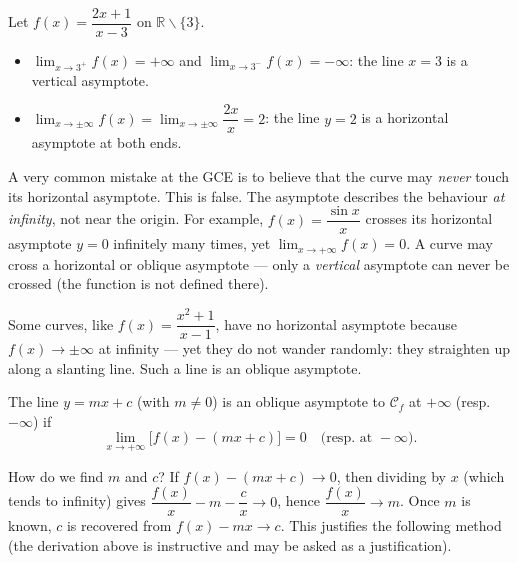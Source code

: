 \documentclass[11pt]{article}
\newcommand{\cle}[1]{{\popxbold\color{popdark}#1}}
\newcounter{popsec}
\newcounter{popsub}
\newcommand{\courssub}[1]{%
  \stepcounter{popsub}%
  \par\vspace{9pt}\noindent{\popxbold\fontsize{11.5}{13}\selectfont\color{popink}{\color{poporange}\thepopsec.\thepopsub}\hspace{6pt}#1}\par\nopagebreak\vspace{4pt}
}
\def\setminus{\mathbin{\backslash}}\let\smallsetminus\setminus
\begin{document}
\begin{exemplebox}
Let $f(x)=\dfrac{2x+1}{x-3}$ on $\mathbb{R}\setminus\{3\}$.
\begin{itemize}
\item $\displaystyle\lim_{x\to 3^{+}}f(x)=+\infty$ and $\displaystyle\lim_{x\to 3^{-}}f(x)=-\infty$: the line $x=3$ is a vertical asymptote.
\item $\displaystyle\lim_{x\to\pm\infty}f(x)=\lim_{x\to\pm\infty}\dfrac{2x}{x}=2$: the line $y=2$ is a horizontal asymptote at both ends.
\end{itemize}
\end{exemplebox}

\begin{attention}
A very common mistake at the GCE is to believe that the curve may \emph{never} touch its horizontal asymptote. This is false. The asymptote describes the behaviour \emph{at infinity}, not near the origin. For example, $f(x)=\dfrac{\sin x}{x}$ crosses its horizontal asymptote $y=0$ infinitely many times, yet $\lim_{x\to+\infty}f(x)=0$. A curve may cross a horizontal or oblique asymptote — only a \emph{vertical} asymptote can never be crossed (the function is not defined there).
\end{attention}

\courssub{Oblique Asymptotes}

Some curves, like $f(x)=\dfrac{x^{2}+1}{x-1}$, have no horizontal asymptote because $f(x)\to\pm\infty$ at infinity — yet they do not wander randomly: they straighten up along a slanting line. Such a line is an \cle{oblique asymptote}.

\begin{definition}
The line $y=mx+c$ (with $m\neq 0$) is an \cle{oblique asymptote} to $\mathcal{C}_f$ at $+\infty$ (resp.\ $-\infty$) if
\[ \lim_{x\to+\infty}\bigl[f(x)-(mx+c)\bigr]=0 \quad\text{(resp.\ at } -\infty\text{)}. \]
\end{definition}

How do we find $m$ and $c$? If $f(x)-(mx+c)\to 0$, then dividing by $x$ (which tends to infinity) gives $\dfrac{f(x)}{x}-m-\dfrac{c}{x}\to 0$, hence $\dfrac{f(x)}{x}\to m$. Once $m$ is known, $c$ is recovered from $f(x)-mx\to c$. This justifies the following method (the derivation above is instructive and may be asked as a justification).
\end{document}
